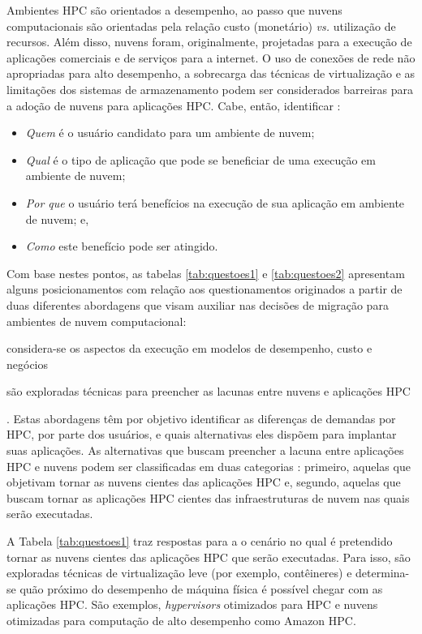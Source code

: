 \documentclass[tese,capa]{texufpel}
\begin{document}
Ambientes HPC são orientados a desempenho, ao passo que nuvens computacionais são orientadas pela relação custo (monetário) \emph{vs.} utilização de recursos. Além disso, nuvens foram, originalmente, projetadas para a execução de aplicações comerciais e de serviços para a internet. O uso de conexões de rede não apropriadas para alto desempenho, a sobrecarga das técnicas de virtualização e as limitações dos sistemas de armazenamento podem ser considerados barreiras para a adoção de nuvens para aplicações HPC. Cabe, então, identificar \cite{guptaEvaluatingImprovingPerformance2016d}:

\begin{itemize}[noitemsep]
    \item \emph{Quem} é o usuário candidato para um ambiente de nuvem;
    \item \emph{Qual} é o tipo de aplicação que pode se beneficiar de uma execução em ambiente de nuvem;
    \item \emph{Por que} o usuário terá benefícios na execução de sua aplicação em ambiente de nuvem; e,
    \item \emph{Como} este benefício pode ser atingido.
\end{itemize}

Com base nestes pontos, as tabelas \ref{tab:questoes1} e \ref{tab:questoes2} apresentam alguns posicionamentos com relação aos questionamentos originados a partir de duas diferentes abordagens que visam auxiliar nas decisões de migração para ambientes de nuvem computacional: 
\begin{enumerate*}[label=\textit{\alph*}),itemjoin={{; }},itemjoin*={{; e }}]
  \item considera-se os aspectos da execução em modelos de desempenho, custo e negócios
  \item são exploradas técnicas para preencher as lacunas entre nuvens e aplicações HPC
\end{enumerate*}. Estas abordagens têm por objetivo identificar as diferenças de demandas por HPC, por parte dos usuários, e quais alternativas eles dispõem para implantar suas aplicações. As alternativas que buscam preencher a lacuna entre aplicações HPC e nuvens podem ser classificadas em duas categorias \cite{guptaEvaluatingImprovingPerformance2016d}: primeiro, aquelas que objetivam tornar as nuvens cientes das aplicações HPC e, segundo, aquelas que buscam tornar as aplicações HPC cientes das infraestruturas de nuvem nas quais serão executadas.

A Tabela \ref{tab:questoes1} traz respostas para a o cenário no qual é pretendido tornar as nuvens cientes das aplicações HPC que serão executadas. Para isso, são exploradas técnicas de virtualização leve (por exemplo, contêineres) e determina-se quão próximo do desempenho de máquina física é possível chegar com as aplicações HPC. São exemplos, \textit{hypervisors} otimizados para HPC e nuvens otimizadas para computação de alto desempenho como Amazon HPC.
\end{document}
